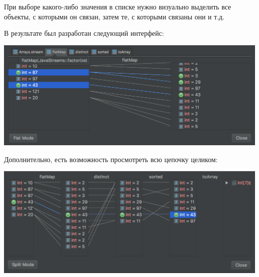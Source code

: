 При выборе какого-либо значения в списке нужно визуально выделить все объекты, с которыми он связан, затем те, с которыми связаны они и т.д. 

В результате был разработан следующий интерфейс:

\includegraphics[scale=0.25]{chapter3/img/split-view.png}

Дополнительно, есть возможность просмотреть всю цепочку целиком:

\includegraphics[scale=0.36]{chapter3/img/flat-view.png}










